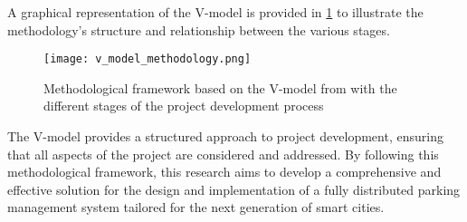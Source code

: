 A graphical representation of the V-model is provided in \cref{fig:v_model_methodology} to illustrate the methodology's structure and relationship between the various stages.

\begin{figure}
  \texttt{[image: v\_model\_methodology.png]}
  \caption{Methodological framework based on the V-model from  with the different stages of the project development process\autocite{ruddle2020vmodel}}\label{fig:v_model_methodology}
\end{figure}

The V-model provides a structured approach to project development, ensuring that all aspects of the project are considered and addressed. By following this methodological framework, this research aims to develop a comprehensive and effective solution for the design and implementation of a fully distributed parking management system tailored for the next generation of smart cities.

